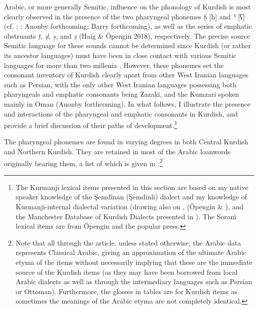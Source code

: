 \documentclass[output=paper]{langsci/langscibook}
\begin{document}
Arabic, or more generally Semitic, influence on the phonology of Kurdish is most clearly observed in the presence of the two pharyngeal phonemes \textit{ḥ} [ħ] and \textit{ʿ} [ʕ] (cf. \citealt{Kahn1976}; \citealt{Haig2007}; Anonby forthcoming; Barry forthcoming), as well as the series of emphatic obstruants \textit{ṭ,} \textit{ḍ,} \textit{ṣ,} and \textit{ẓ} (Haig \& Öpengin 2018), respectively. The precise source Semitic language for these sounds cannot be determined since Kurdish (or rather its ancestor languages) must have been in close contact with various Semitic languages for more than two millenia \citep[69]{Utas2005}. However, these phonemes set the consonant inventory of Kurdish clearly apart from other West Iranian languages such as Persian, with the only other West Iranian languages possessing both pharyngeals and emphatic consonants being Zazaki, and the Kumzari spoken mainly in Oman (Anonby forthcoming). In what follows, I illustrate the presence and interactions of the pharyngeal and emphatic consonants in Kurdish, and provide a brief discussion of their paths of development.\footnote{The Kurmanji lexical items presented in this section are based on my native speaker knowledge of the Şemdînan (Şemdinli) dialect and my knowledge of Kurmanji-internal dialectal variation (drawing also on \citep{Chyet2003}, (Öpengin \& \citealt{Haig2014}), and the  Manchester Database of Kurdish Dialects presented in \citep{MatrasEtAl2016}). The Sorani lexical items are from Öpengin  and the popular press.}  

The pharyngeal phonemes are found in varying degrees in both Central Kurdish and Northern Kurdish. They are retained in most of the Arabic loanwords originally bearing them, a list of which is given in :\footnote{Note that all through the article, unless stated otherwise, the Arabic data represents Classical Arabic, giving an approximation of the ultimate Arabic etyma of the items without necessarily implying that these are the immediate source of the Kurdish items (as they may have been borrowed from local Arabic dialects as well as through the intermediary languages such as Persian or Ottoman). Furthermore, the glosses in tables are for Kurdish items as sometimes the meanings of the Arabic etyma are not completely identical.} 
\end{document}
